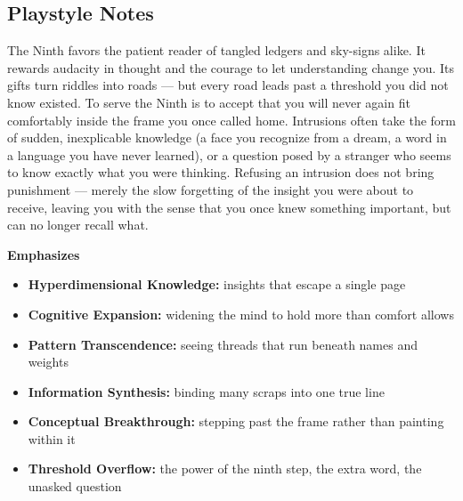 \subsection*{Playstyle Notes}
The Ninth favors the patient reader of tangled ledgers and sky-signs alike. It rewards audacity in thought and the courage to let understanding change you. Its gifts turn riddles into roads --- but every road leads past a threshold you did not know existed. To serve the Ninth is to accept that you will never again fit comfortably inside the frame you once called home. Intrusions often take the form of sudden, inexplicable knowledge (a face you recognize from a dream, a word in a language you have never learned), or a question posed by a stranger who seems to know exactly what you were thinking. Refusing an intrusion does not bring punishment --- merely the slow forgetting of the insight you were about to receive, leaving you with the sense that you once knew something important, but can no longer recall what.

\noindent\textbf{Emphasizes}
\begin{itemize}
  \item \textbf{Hyperdimensional Knowledge:} insights that escape a single page
  \item \textbf{Cognitive Expansion:} widening the mind to hold more than comfort allows
  \item \textbf{Pattern Transcendence:} seeing threads that run beneath names and weights
  \item \textbf{Information Synthesis:} binding many scraps into one true line
  \item \textbf{Conceptual Breakthrough:} stepping past the frame rather than painting within it
  \item \textbf{Threshold Overflow:} the power of the ninth step, the extra word, the unasked question
\end{itemize}
